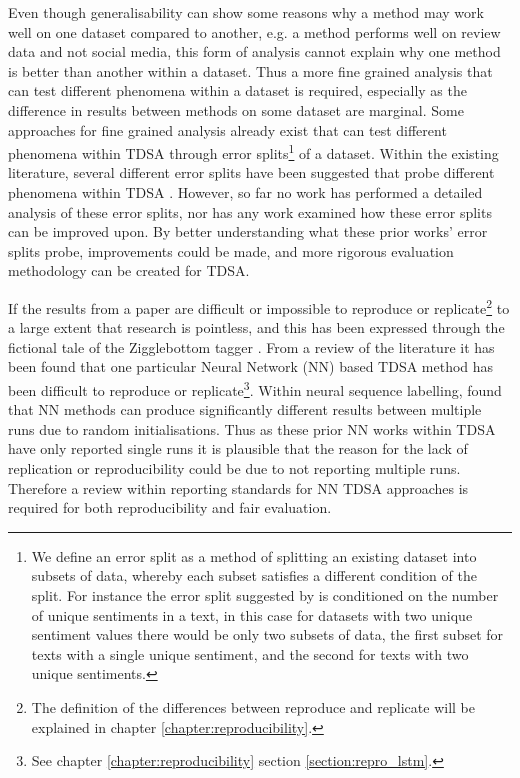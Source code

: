 Even though generalisability can show some reasons why a method may work well on one dataset compared to another, e.g. a method performs well on review data and not social media, this form of analysis cannot explain why one method is better than another within a dataset. Thus a more fine grained analysis that can test different phenomena within a dataset is required, especially as the difference in results between methods on some dataset are marginal. Some approaches for fine grained analysis already exist that can test different phenomena within TDSA through error splits\footnote{We define an error split as a method of splitting an existing dataset into subsets of data, whereby each subset satisfies a different condition of the split. For instance the error split suggested by \citet{wang-etal-2017-tdparse} is conditioned on the number of unique sentiments in a text, in this case for datasets with two unique sentiment values there would be only two subsets of data, the first subset for texts with a single unique sentiment, and the second for texts with two unique sentiments.} of a dataset. Within the existing literature, several different error splits have been suggested that probe different phenomena within TDSA \citep{nguyen-shirai-2015-phrasernn,wang-etal-2017-tdparse,he-etal-2018-exploiting,yang2018multi}. However, so far no work has performed a detailed analysis of these error splits, nor has any work examined how these error splits can be improved upon. By better understanding what these prior works' error splits probe, improvements could be made, and more rigorous evaluation methodology can be created for TDSA.

If the results from a paper are difficult or impossible to reproduce or replicate\footnote{The definition of the differences between reproduce and replicate will be explained in chapter \ref{chapter:reproducibility}.} to a large extent that research is pointless, and this has been expressed through the fictional tale of the Zigglebottom tagger \citep{pedersen-2008-last}. From a review of the literature it has been found that one particular Neural Network (NN) based TDSA method has been difficult to reproduce or replicate\footnote{See chapter \ref{chapter:reproducibility} section \ref{section:repro_lstm}.}. Within neural sequence labelling, \citet{reimers-gurevych-2017-reporting} found that NN methods can produce significantly different results between multiple runs due to random initialisations. Thus as these prior NN works within TDSA have only reported single runs it is plausible that the reason for the lack of replication or reproducibility could be due to not reporting multiple runs. Therefore a review within reporting standards for NN TDSA approaches is required for both reproducibility and fair evaluation.

